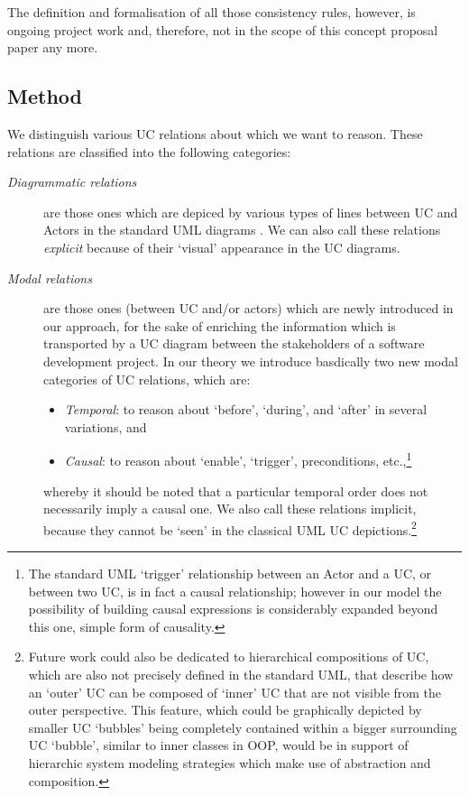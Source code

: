 The definition and formalisation of all those consistency rules, 
however, is ongoing project work and, therefore, not in the scope 
of this concept proposal paper any more.
 
\subsection{Method}

We distinguish various UC relations about which we want to reason. 
These relations are classified into the following categories:
\begin{description}
\item[\it Diagrammatic relations] 
 are those ones which are depiced by various types of lines between 
 UC and Actors in the standard UML diagrams \cite{KGu04}. We can 
 also call these relations \emph{explicit} because of their `visual' 
 appearance in the UC diagrams.
\item[\it Modal relations] 
 are those ones (between UC and/or actors) which are newly introduced 
 in our approach, for the sake of enriching the information which is
 transported by a UC diagram between the stakeholders of a software
 development project. In our theory we introduce basdically two new
 modal categories of UC relations, which are:
 \begin{itemize} 
 \item \emph{Temporal}: to reason about `before', `during', and `after'
        in several variations, and 
 \item \emph{Causal}: to reason about `enable', `trigger', 
        pre\-con\-di\-ti\-ons, etc.,\footnote{The standard UML `trigger' 
        relationship between an Actor and a UC, or between two UC, is in 
        fact a causal relationship; however in our model the possibility 
        of building causal expressions is considerably expanded beyond
        this one, simple form of causality.} 
 \end{itemize}
whereby it should be noted that a particular temporal order does not 
necessarily imply a causal one. We also call these relations implicit, 
because they cannot be `seen' in the classical UML UC 
depictions.\footnote{Future work could also be dedicated to hierarchical 
  compositions of UC, which are also not precisely defined in the standard 
  UML, that describe how an `outer' UC can be composed of `inner' UC that 
  are not visible from the outer perspective. This feature, which could be
  graphically depicted by smaller UC `bubbles' being completely contained 
  within a bigger surrounding UC `bubble', similar to inner classes in OOP, 
  would be in support of hierarchic system modeling strategies which make 
  use of abstraction and composition.}
\end{description}
